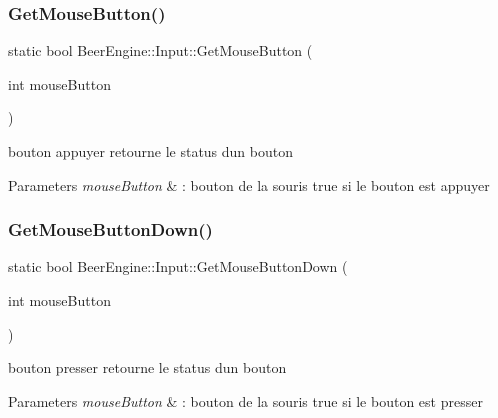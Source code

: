 \subsubsection{\texorpdfstring{Get\+Mouse\+Button()}{GetMouseButton()}}
{\footnotesize\ttfamily static bool Beer\+Engine\+::\+Input\+::\+Get\+Mouse\+Button (\begin{DoxyParamCaption}\item[{int}]{mouse\+Button }\end{DoxyParamCaption})\hspace{0.3cm}{\ttfamily [static]}}



bouton appuyer retourne le status d\textquotesingle{}un bouton 


\begin{DoxyParams}{Parameters}
{\em mouse\+Button} & \+: bouton de la souris  true si le bouton est appuyer \\
\hline
\end{DoxyParams}
\mbox{\label{class_beer_engine_1_1_input_ad04218c44ce0ef21ed6a5cf65259653f}} 
\subsubsection{\texorpdfstring{Get\+Mouse\+Button\+Down()}{GetMouseButtonDown()}}
{\footnotesize\ttfamily static bool Beer\+Engine\+::\+Input\+::\+Get\+Mouse\+Button\+Down (\begin{DoxyParamCaption}\item[{int}]{mouse\+Button }\end{DoxyParamCaption})\hspace{0.3cm}{\ttfamily [static]}}



bouton presser retourne le status d\textquotesingle{}un bouton 


\begin{DoxyParams}{Parameters}
{\em mouse\+Button} & \+: bouton de la souris  true si le bouton est presser \\
\hline
\end{DoxyParams}
\mbox{\label{class_beer_engine_1_1_input_a82dc5f380752307d5cb5b284488da5ef}} 
